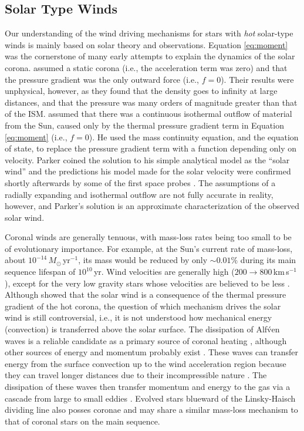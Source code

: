 \subsection{Solar Type Winds}\label{sec:1.4.2}
Our understanding of the wind driving mechanisms for stars with \textit{hot} solar-type winds is mainly based on solar theory and observations. Equation \ref{eq:moment} was the cornerstone of many early attempts to explain the dynamics of the solar corona. \cite{chapman_1957} assumed a static corona (i.e., the acceleration term was zero) and that the pressure gradient was the only outward force (i.e., $f=0$). Their results were unphysical, however, as they found that the density goes to infinity at large distances, and that the pressure was many orders of magnitude greater than that of the ISM. \cite{parker_1958} assumed that there was a continuous isothermal outflow of material from the Sun, caused only by the thermal pressure gradient term in Equation \ref{eq:moment} (i.e., $f=0$). He used the mass continuity equation, and the equation of state, to replace the pressure gradient term with a function depending only on velocity. Parker coined the solution to his simple analytical model as the ``solar wind'' and the predictions his model made for the solar velocity were confirmed shortly afterwards by some of the first space probes \citep[e.g.,][]{neugebauer_1962}. The assumptions of a radially expanding and isothermal outflow are not fully accurate in reality, however, and Parker's solution is an approximate characterization of the observed solar wind.

Coronal winds are generally tenuous, with mass-loss rates being too small to be of evolutionary importance. For example, at the Sun's current rate of mass-loss, about $10^{-14}\,M_{\odot}$\,yr$^{-1}$, its mass would be reduced by only $\sim 0.01 \%$ during its main sequence lifespan of $10^{10}$\,yr. Wind velocities are generally high ($200 \rightarrow 800$\,km\,s$^{-1}$), except for the very low gravity stars whose velocities are believed to be less \cite{drake_1986}. Although \cite{parker_1958} showed that the solar wind is a consequence of the thermal pressure gradient of the hot corona, the question of which mechanism drives the solar wind is still controversial, i.e., it is not understood how mechanical energy (convection) is transferred above the solar surface. The dissipation of Alf\'ven waves is a reliable candidate as a primary source of coronal heating \citep{cranmer_2011}, although other sources of energy and momentum probably exist \cite[e.g.,][]{parker_1983,parker_1988}. These waves can transfer energy from the surface convection up to the wind acceleration region because they can travel longer distances due to their incompressible nature \citep[e.g.,][]{hollweg_1973}. The dissipation of these waves then transfer momentum and energy to the gas via a cascade from large to small eddies \citep{verdini_2007}. Evolved stars blueward of the Linsky-Haisch dividing line also posses coronae and may share a similar mass-loss mechanism to that of coronal stars on the main sequence. 

